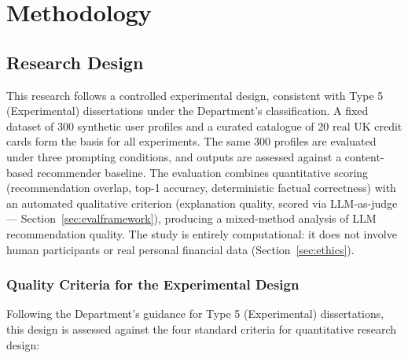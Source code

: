 \chapter{Methodology}
\label{ch:methodology}

\section{Research Design}

This research follows a controlled experimental design, consistent with Type 5 (Experimental) dissertations under the Department's classification. A fixed dataset of 300 synthetic user profiles and a curated catalogue of 20 real UK credit cards form the basis for all experiments. The same 300 profiles are evaluated under three prompting conditions, and outputs are assessed against a content-based recommender baseline. The evaluation combines quantitative scoring (recommendation overlap, top-1 accuracy, deterministic factual correctness) with an automated qualitative criterion (explanation quality, scored via LLM-as-judge --- Section~\ref{sec:evalframework}), producing a mixed-method analysis of LLM recommendation quality. The study is entirely computational: it does not involve human participants or real personal financial data (Section~\ref{sec:ethics}).

\subsection{Quality Criteria for the Experimental Design}
\label{sec:quality-criteria}

Following the Department's guidance for Type 5 (Experimental) dissertations, this design is assessed against the four standard criteria for quantitative research design:

